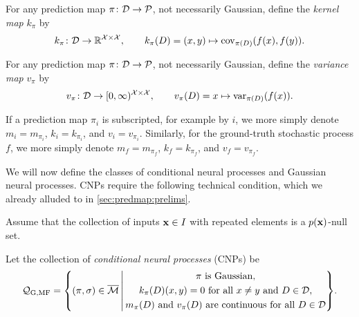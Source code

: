\documentclass[12pt, twoside]{report}
\begin{document}
\begin{definition}
    \label{def:kernel_map}
    For any prediction map $\pi \colon \mathcal{D} \to \mathcal{P}$, not necessarily Gaussian, define the \emph{kernel map} $k_\pi$ by
    \begin{equation}
        k_\pi\colon \mathcal{D} \to \mathbb{R}^{\mathcal{X} \times \mathcal{X}}, \qquad
        k_\pi(D) = (x, y) \mapsto \operatorname{cov}_{\pi(D)}(f(x), f(y)).
    \end{equation}
\end{definition}

\begin{definition}
    \label{def:variance_map}
    For any prediction map $\pi \colon \mathcal{D} \to \mathcal{P}$, not necessarily Gaussian, define the \emph{variance map} $v_\pi$ by
    \begin{equation}
        v_\pi\colon \mathcal{D} \to [0,\infty)^{\mathcal{X} \times \mathcal{X}}, \qquad
        v_\pi(D) = x \mapsto \operatorname{var}_{\pi(D)}(f(x)).
    \end{equation}
\end{definition}

If a prediction map $\pi_i$ is subscripted, for example by $i$, we more simply denote $m_i = m_{\pi_i}$, $k_i = k_{\pi_i}$, and $v_i = v_{\pi_i}$.
Similarly, for the ground-truth stochastic process $f$, we more simply denote $m_f = m_{\pi_f}$, $k_f = k_{\pi_f}$, and $v_f = v_{\pi_f}$.

We will now define the classes of conditional neural processes and Gaussian neural processes.
CNPs require the following technical condition, which we already alluded to in \cref{sec:predmap:prelims}.

\begin{assumption} \label{assum:repeated_elements_is_null_set}
    Assume that the collection of inputs $\mathbf{x} \in I$ with repeated elements is a $p(\mathbf{x})$-null set.
\end{assumption}

\begin{definition}
    \label{def:cnp}
    Let the collection of \emph{conditional neural processes} (CNPs) be
    \begin{equation}
        \Qc\ss{G,MF} = \set*{(\pi, \sigma) \in \overline{\M}
            \middlecond
            \begin{gathered}
                \text{\normalshape $\pi$ is Gaussian}, \\
                \text{\normalshape $k_\pi(D)(x, y) = 0$ for all $x \neq y$ and $D \in \D$}, \\
                \text{\normalshape $m_\pi(D)$ and $v_\pi(D)$ are continuous for all $D \in \D$} \\
            \end{gathered}
        }.
    \end{equation}
\end{definition}
\end{document}
